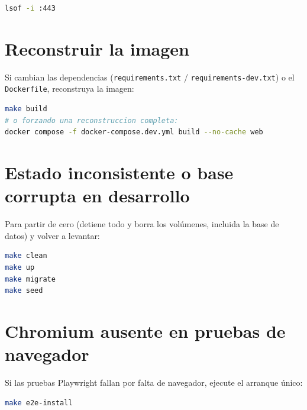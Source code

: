 \documentclass[12pt,letterpaper]{report}
\begin{document}
\begin{lstlisting}[language=bash]
lsof -i :443
\end{lstlisting}

\section{Reconstruir la imagen}

Si cambian las dependencias (\texttt{requirements.txt} /
\texttt{requirements-dev.txt}) o el \texttt{Dockerfile}, reconstruya la imagen:

\begin{lstlisting}[language=bash]
make build
# o forzando una reconstruccion completa:
docker compose -f docker-compose.dev.yml build --no-cache web
\end{lstlisting}

\section{Estado inconsistente o base corrupta en desarrollo}

Para partir de cero (detiene todo y borra los volúmenes, incluida la base de
datos) y volver a levantar:

\begin{lstlisting}[language=bash]
make clean
make up
make migrate
make seed
\end{lstlisting}

\section{Chromium ausente en pruebas de navegador}

Si las pruebas Playwright fallan por falta de navegador, ejecute el arranque único:

\begin{lstlisting}[language=bash]
make e2e-install
\end{lstlisting}
\end{document}
